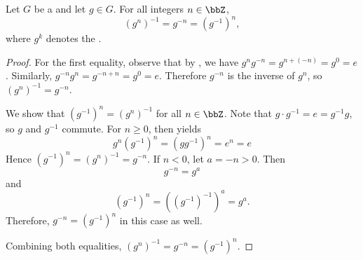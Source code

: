 \begin{lemma} \label{lemma:inverse_of_power_equals_power_of_inverse_in_a_group}
    Let $G$ be a  and let $g \in G$. For all integers $n \in \bbZ$,
    $$(g^n)^{-1} = g^{-n} = (g^{-1})^n,$$
    where $g^k$ denotes the .
\end{lemma}
\begin{proof}
    For the first equality, observe that by , we have $g^n g^{-n} = g^{n + (-n)} = g^0 = e$. Similarly, $g^{-n} g^n = g^{-n + n} = g^0 = e$. Therefore $g^{-n}$ is the inverse of $g^n$, so $(g^n)^{-1} = g^{-n}$.

    We show that $(g^{-1})^n = (g^{n})^{-1}$ for all $n \in \bbZ$. Note that $g \cdot g^{-1} = e = g^{-1} g$, so $g$ and $g^{-1}$ commute. For $n \geq 0$,  then yields
    $$g^n (g^{-1})^n = (g g^{-1})^n = e^n = e$$
    Hence $(g^{-1})^n = (g^n)^{-1} = g^{-n}$. If $n < 0$, let $a = -n > 0$. Then
    $$g^{-n} = g^a$$
    and
    $$(g^{-1})^n = ((g^{-1})^{-1})^a = g^a.$$
     Therefore, $g^{-n} = (g^{-1})^n$ in this case as well.

    Combining both equalities, $(g^n)^{-1} = g^{-n} = (g^{-1})^n$.
\end{proof}
